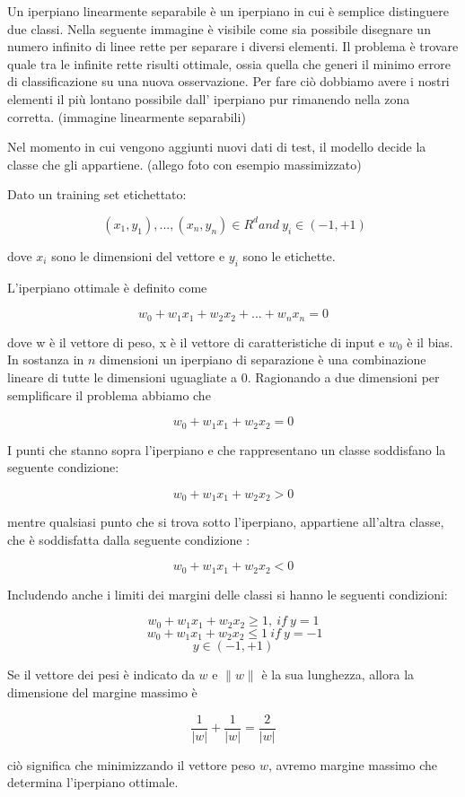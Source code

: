 \documentclass[12pt,italian]{report}
\begin{document}
Un iperpiano linearmente separabile è un iperpiano in cui è semplice distinguere due classi. Nella seguente immagine è visibile come sia possibile disegnare un numero infinito di linee rette per separare i diversi elementi. Il problema è trovare quale tra le infinite rette risulti ottimale, ossia quella che generi il minimo errore di classificazione su una nuova osservazione.
Per fare ciò dobbiamo avere i nostri elementi il più lontano possibile dall' iperpiano pur rimanendo nella zona corretta. (immagine linearmente separabili)

Nel momento in cui vengono aggiunti nuovi dati di test, il modello decide la classe che gli appartiene. (allego foto con esempio massimizzato)

Dato un training set etichettato:

\begin{center}
	\[
	\ (x_1, y_1), ..., (x_n, y_n) \in R^{d} and 
	\ y_i \in (-1, +1)
	\]
\end{center}
dove $x_i$ sono le dimensioni del vettore e $y_i$ sono le etichette.

L'iperpiano ottimale è definito come 
\begin{center}
	\[w_0 + w_1x_1 + w_2x_2 +...+ w_nx_n= 0\]
\end{center}
dove w è il vettore di peso, x è il vettore di caratteristiche di input e $w_0$ è il bias.
In sostanza in $n$ dimensioni un iperpiano di separazione è una combinazione lineare di tutte le dimensioni uguagliate a 0.
Ragionando a due dimensioni per semplificare il problema abbiamo che 
\begin{center}
	\[w_0 + w_1x_1 + w_2x_2 = 0\]
\end{center}
I punti che stanno sopra l'iperpiano e che rappresentano un classe soddisfano la seguente condizione:
\begin{center}
	\[w_0 + w_1x_1+w_2x_2 > 0\]
\end{center}
mentre qualsiasi punto che si trova sotto l'iperpiano, appartiene all'altra classe, che è soddisfatta dalla seguente condizione :
\begin{center}
	\[w_0 + w_1x_1+w_2x_2 < 0\]
\end{center}
Includendo anche i limiti dei margini delle classi si hanno le seguenti condizioni:
\begin{center}
	\[w_0 + w_1x_1+w_2x_2 \geq 1,
	\ if
	\ y=1\]
	\[
	\ w_0 + w_1x_1+w_2x_2 \leq 1 
	\ if
	\ y = -1
	\]
	\[ y \in (-1, +1)\]
\end{center}
Se il vettore dei pesi è indicato da $w$ e $\parallel w \parallel$ è la sua lunghezza, allora la dimensione del margine massimo è 
\begin{center}
	\[ \frac{1}{\left | w \right |} + \frac{1}{\left | w \right |} = \frac{2}{\left | w \right |}\]
\end{center}
ciò significa che minimizzando il vettore peso $w$, avremo margine massimo che determina l'iperpiano ottimale.
\end{document}
